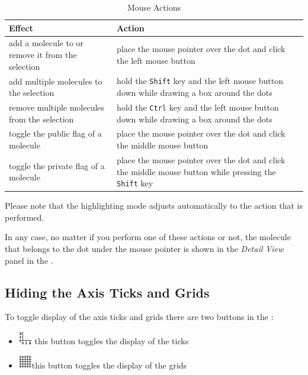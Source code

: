 \begin{table}[!htb]
  \centering
  \begin{tabular}{p{}p{}}
  \textbf{Effect} & \textbf{Action}\\ \toprule
  add a molecule to or remove it from the selection & place the mouse pointer over the dot and click the left mouse button\\ \hline

  add multiple molecules to the selection & hold the \texttt{Shift} key and the left mouse button down while drawing a box
  around the dots\\ \hline

  remove multiple molecules from the selection & hold the \texttt{Ctrl} key and the left mouse button down while drawing a box
  around the dots\\ \hline

  toggle the public flag of a molecule & place the mouse pointer over the dot and click the middle mouse button\\ \hline

  toggle the private flag of a molecule & place the mouse pointer over the dot and click the middle mouse button
  while pressing the \texttt{Shift} key\\ \bottomrule
  \end{tabular}
  \caption{\Pview Mouse Actions}
  \label{tableview mouse actions table}
\end{table}



Please note that the highlighting mode adjusts automatically to the
action that is performed.

In any case, no matter if you perform one of these actions or not, the
molecule that belongs to the dot under the mouse pointer is shown in
the \textit{Detail View} panel in the \sbar.


\subsection{Hiding the Axis Ticks and Grids}

To toggle display of the axis ticks and grids there are two buttons
in the \tbar:
\begin{itemize}
\item \includegraphics{images/plot/plot_toggle_ticks} this
button toggles the display of the ticks
\item \includegraphics{images/plot/plot_toggle_grid}this
button toggles the display of the grids
\end{itemize}
